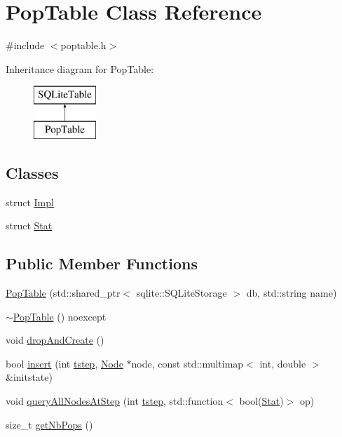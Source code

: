\hypertarget{class_pop_table}{}\section{Pop\+Table Class Reference}
\label{class_pop_table}


{\ttfamily \#include $<$poptable.\+h$>$}

Inheritance diagram for Pop\+Table\+:\begin{figure}[H]
\begin{center}
\leavevmode
\includegraphics[height=2.000000cm]{d3/d1b/class_pop_table}
\end{center}
\end{figure}
\subsection*{Classes}
\begin{DoxyCompactItemize}
\item 
struct \mbox{\hyperlink{struct_pop_table_1_1_impl}{Impl}}
\item 
struct \mbox{\hyperlink{struct_pop_table_1_1_stat}{Stat}}
\end{DoxyCompactItemize}
\subsection*{Public Member Functions}
\begin{DoxyCompactItemize}
\item 
\mbox{\hyperlink{class_pop_table_a0c04f8809217579c77178579fdefd379}{Pop\+Table}} (std\+::shared\+\_\+ptr$<$ sqlite\+::\+S\+Q\+Lite\+Storage $>$ db, std\+::string name)
\item 
\mbox{\hyperlink{class_pop_table_a37937514ef03f628721c224576114a23}{$\sim$\+Pop\+Table}} () noexcept
\item 
void \mbox{\hyperlink{class_pop_table_a10cb820d1c4db4b5f9ba4254f50de2ba}{drop\+And\+Create}} ()
\item 
bool \mbox{\hyperlink{class_pop_table_ab2223d3a850c264d33ef1ffb542823eb}{insert}} (int \mbox{\hyperlink{thread__vessels_8cpp_a84bc73d278de929ec9974e1a95d9b23a}{tstep}}, \mbox{\hyperlink{class_node}{Node}} $\ast$node, const std\+::multimap$<$ int, double $>$ \&initstate)
\item 
void \mbox{\hyperlink{class_pop_table_ade975fd272ea909ceb25caf5ebd46013}{query\+All\+Nodes\+At\+Step}} (int \mbox{\hyperlink{thread__vessels_8cpp_a84bc73d278de929ec9974e1a95d9b23a}{tstep}}, std\+::function$<$ bool(\mbox{\hyperlink{struct_pop_table_1_1_stat}{Stat}})$>$ op)
\item 
size\+\_\+t \mbox{\hyperlink{class_pop_table_a79062d746df1e7dda6061c2105e0e418}{get\+Nb\+Pops}} ()
\end{DoxyCompactItemize}


